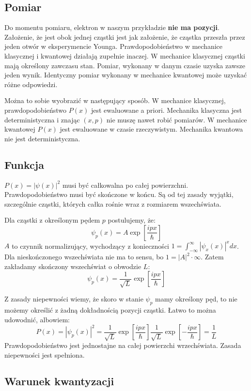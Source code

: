 \documentclass{../notatki}
\begin{document}
\subsection{Pomiar}

Do momentu pomiaru, elektron w naszym przykładzie \textbf{nie ma
pozycji}. Założenie, że
jest obok jednej cząstki jest jak założenie, że cząstka przeszła przez jeden
otwór w eksperymencie Younga. Prawdopodobieństwo w mechanice
klasycznej i kwantowej działają zupełnie inaczej. W mechanice klasycznej
cząstki mają określony zawczasu stan. Pomiar, wykonany w danym czasie uzyska
zawsze jeden wynik. Identyczny pomiar wykonany w mechanice kwantowej może
uzyskać różne odpowiedzi.

Można to sobie wyobrazić w następujący sposób. W mechanice
klasycznej, prawdopodobieństwo $P(x)$ jest ewaluowane a priori.
Mechanika klasyczna jest deterministyczna i znając $(x, p)$ nie muszę
nawet robić pomiarów. W mechanice kwantowej $P(x)$ jest ewaluowane w czasie
rzeczywistym. Mechanika kwantowa nie jest deterministyczna.

\subsection{Funkcja}

$P(x) = |\psi(x)|^2$ musi być całkowalna po całej powierzchni.
Prawdopodobieństwo musi być skończone w końcu. Są od tej zasady
wyjątki, szczególnie cząstki, których całka rośnie wraz z rozmiarem
wszechświata.

Dla cząstki z określonym pędem $p$ postulujemy, że:
$$
\psi_p(x) = A\exp[\frac{ipx}{\hbar}]
$$
$A$ to czynnik normalizujący, wychodzący z konieczności
$1 = \int_{-\infty}^{\infty} |\psi_x(x)|^x dx$. Dla nieskończonego
wszechświata nie ma to sensu, bo $1 = |A|^2 \cdot \infty$.
Zatem zakładamy skończony wszechświat o obwodzie $L$:
$$
\psi_p(x) = \frac{1}{\sqrt{L}}\exp[\frac{ipx}{\hbar}]
$$

Z zasady niepewności wiemy, że skoro w stanie $\psi_p$ mamy określony pęd, to
nie możemy określić z żadną dokładnością pozycji cząstki. Łatwo to
można udowodnić,
albowiem:
$$
P(x) = |\psi_p(x)|^2 =
\frac{1}{\sqrt{L}}\exp[\frac{ipx}{\hbar}]\frac{1}{\sqrt{L}}\exp[-\frac{ipx}{\hbar}]
= \frac{1}{L}
$$
Prawdopodobieństwo jest jednostajne na całej powierzchi wrzechświata. Zasada
niepewności jest spełniona.

\subsection{Warunek kwantyzacji}
\end{document}
